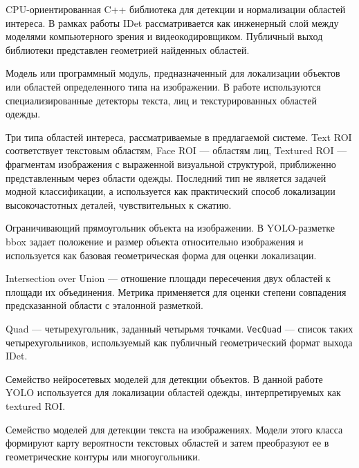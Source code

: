 \documentclass[12pt,a4paper,oneside,openany]{report}
\begin{document}
\begin{description}[style=nextline,leftmargin=1.25cm,labelsep=0.5em]
  \item[IDet]
      CPU-ориентированная C++ библиотека для детекции и нормализации областей интереса.
      В рамках работы IDet рассматривается как инженерный слой между моделями компьютерного
      зрения и видеокодировщиком. Публичный выход библиотеки представлен геометрией найденных
      областей.

  \item[Детектор]
      Модель или программный модуль, предназначенный для локализации объектов или областей
      определенного типа на изображении. В работе используются специализированные детекторы
      текста, лиц и текстурированных областей одежды.

  \item[Text ROI, Face ROI, Textured ROI]
      Три типа областей интереса, рассматриваемые в предлагаемой системе. Text ROI соответствует
      текстовым областям, Face ROI --- областям лиц, Textured ROI --- фрагментам изображения
      с выраженной визуальной структурой, приближенно представленным через области одежды.
      Последний тип не является задачей модной классификации, а используется как практический
      способ локализации высокочастотных деталей, чувствительных к сжатию.

  \item[BBox]
      Ограничивающий прямоугольник объекта на изображении. В YOLO-разметке bbox задает
      положение и размер объекта относительно изображения и используется как базовая геометрическая
      форма для оценки локализации.

  \item[IoU]
      Intersection over Union --- отношение площади пересечения двух областей к площади их
      объединения. Метрика применяется для оценки степени совпадения предсказанной области
      с эталонной разметкой.

  \item[Quad, \texttt{VecQuad}]
      Quad --- четырехугольник, заданный четырьмя точками. \texttt{VecQuad} --- список таких
      четырехугольников, используемый как публичный геометрический формат выхода IDet.

  \item[YOLO]
      Семейство нейросетевых моделей для детекции объектов. В данной работе YOLO используется
      для локализации областей одежды, интерпретируемых как textured ROI.

  \item[DBNet/DBNet++]
      Семейство моделей для детекции текста на изображениях. Модели этого класса формируют
      карту вероятности текстовых областей и затем преобразуют ее в геометрические контуры
      или многоугольники.


\end{description}
\end{document}
